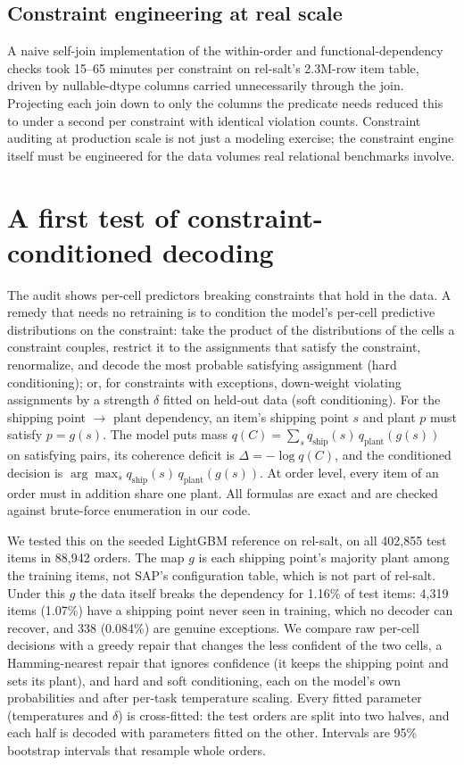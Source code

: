 \documentclass[11pt]{article}
\begin{document}
\subsection{Constraint engineering at real scale}

A naive self-join implementation of the within-order and functional-dependency checks took
15--65 minutes per constraint on rel-salt's 2.3M-row item table, driven by nullable-dtype
columns carried unnecessarily through the join. Projecting each join down to only the columns
the predicate needs reduced this to under a second per constraint with identical violation
counts. Constraint auditing at production scale is not just a modeling exercise; the
constraint engine itself must be engineered for the data volumes real relational benchmarks
involve.

\section{A first test of constraint-conditioned decoding}
\label{sec:ccd}

The audit shows per-cell predictors breaking constraints that hold in the data. A remedy that
needs no retraining is to condition the model's per-cell predictive distributions on the
constraint: take the product of the distributions of the cells a constraint couples, restrict it
to the assignments that satisfy the constraint, renormalize, and decode the most probable
satisfying assignment (hard conditioning); or, for constraints with exceptions, down-weight
violating assignments by a strength $\delta$ fitted on held-out data (soft conditioning). For the
shipping point $\to$ plant dependency, an item's shipping point $s$ and plant $p$ must satisfy
$p = g(s)$. The model puts mass $q(C) = \sum_s q_{\mathrm{ship}}(s)\, q_{\mathrm{plant}}(g(s))$ on
satisfying pairs, its coherence deficit is $\Delta = -\log q(C)$, and the conditioned decision is
$\arg\max_s q_{\mathrm{ship}}(s)\, q_{\mathrm{plant}}(g(s))$. At order level, every item of an order
must in addition share one plant. All formulas are exact and are checked against brute-force
enumeration in our code.

We tested this on the seeded LightGBM reference on rel-salt, on all 402{,}855 test items in
88{,}942 orders. The map $g$ is each shipping point's majority plant among the training items,
not SAP's configuration table, which is not part of rel-salt. Under this $g$ the data itself
breaks the dependency for 1.16\% of test items: 4{,}319 items (1.07\%) have a shipping point
never seen in training, which no decoder can recover, and 338 (0.084\%) are genuine exceptions.
We compare raw per-cell decisions with a greedy repair that changes the less confident of the two
cells, a Hamming-nearest repair that ignores confidence (it keeps the shipping point and sets its
plant), and hard and soft conditioning, each on the model's own probabilities and after per-task
temperature scaling. Every fitted parameter (temperatures and $\delta$) is cross-fitted: the test
orders are split into two halves, and each half is decoded with parameters fitted on the other.
Intervals are 95\% bootstrap intervals that resample whole orders.
\end{document}
